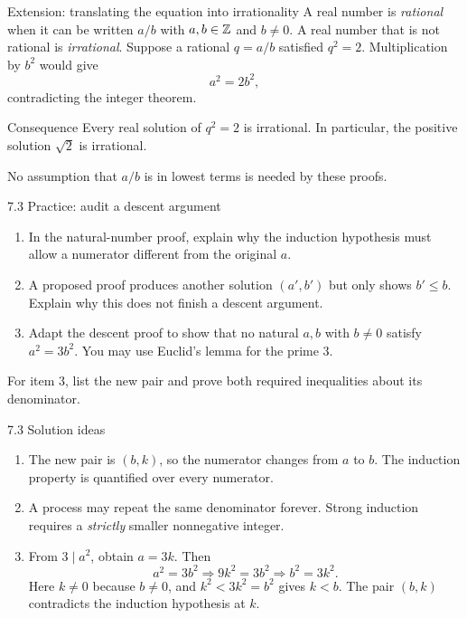 \begin{frame}{Extension: translating the equation into irrationality}
A real number is \emph{rational} when it can be written $a/b$ with $a,b\in\mathbb{Z}$ and $b\ne0$. A real number that is not rational is \emph{irrational}.
\medskip
Suppose a rational $q=a/b$ satisfied $q^2=2$. Multiplication by $b^2$ would give
\[
a^2=2b^2,
\]
contradicting the integer theorem.
\begin{block}{Consequence}
Every real solution of $q^2=2$ is irrational. In particular, the positive solution $\sqrt2$ is irrational.
\end{block}
No assumption that $a/b$ is in lowest terms is needed by these proofs.
\end{frame}

\begin{frame}{7.3 Practice: audit a descent argument}
\begin{enumerate}
\item In the natural-number proof, explain why the induction hypothesis must allow a numerator different from the original $a$.
\item A proposed proof produces another solution $(a',b')$ but only shows $b'\le b$. Explain why this does not finish a descent argument.
\item Adapt the descent proof to show that no natural $a,b$ with $b\ne0$ satisfy $a^2=3b^2$. You may use Euclid's lemma for the prime $3$.
\end{enumerate}
For item 3, list the new pair and prove both required inequalities about its denominator.
\end{frame}

\begin{frame}{7.3 Solution ideas}
\begin{enumerate}
\item The new pair is $(b,k)$, so the numerator changes from $a$ to $b$. The induction property is quantified over every numerator.
\item A process may repeat the same denominator forever. Strong induction requires a \emph{strictly} smaller nonnegative integer.
\item From $3\mid a^2$, obtain $a=3k$. Then
\[
a^2=3b^2\Rightarrow9k^2=3b^2\Rightarrow b^2=3k^2.
\]
Here $k\ne0$ because $b\ne0$, and $k^2<3k^2=b^2$ gives $k<b$. The pair $(b,k)$ contradicts the induction hypothesis at $k$.
\end{enumerate}
\end{frame}

